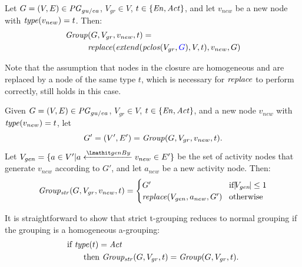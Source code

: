 \vspace{10pt}
\begin{definition}[t-Grouping]
\label{def:t-grouping}
Let $G=(V,E) \in \mathit{PG}_{gu/ea}$, $V_{gr} \in V$, $t \in \{\mathit{En}, \mathit{Act}\}$, and let  $v_{new}$ be a new node with $\mathit{type}(v_{new}) = t$.
%
Then:
\begin{align*} 
\group & (G, V_{gr}, v_{new}, t) = \\
& \repl( \extend(\clos(V_{gr},\jwb{G}), V, t), v_{new},  G )
\end{align*}
\label{eq:t-grouping}
\end{definition}

Note that the assumption that  nodes in the closure are homogeneous and are replaced by a node of the same type $t$, which is necessary for $\mathit{replace}$ to perform correctly, still holds in this case. 

\begin{definition}
Given 
$G=(V,E) \in \mathit{PG}_{gu/ea}$, $V_{gr} \in V$, $t \in \{\mathit{En}, \mathit{Act}\}$, and a new node $v_{new}$ with $\mathit{type}(v_{new}) = t$, let
\[ G' = (V',E') = \mathit{Group}(G, V_{gr}, v_{new}, t). \]
Let 
$V_{gen} = \{ a \in V' |  a \xleftarrow{\wgby} v_{new} \in E' \}$ be the set of activity nodes that generate $v_{new}$ according to $G'$, and let $a_{new}$ be a new activity node. Then:
\begin{equation*}
\mathit{Group_{str}}(G, V_{gr},v_{new}, t)=
\begin{cases}
G' & \!\text{if}  |\!V_{gen}\!| \leq 1  \\
\mathit{replace}(V_{gen}, a_{new}, G') & \!\text{otherwise } 
\end{cases}
\end{equation*}
\label{def:strict-t-grouping}
\end{definition}

% 
% 


It is straightforward to show that strict t-grouping reduces to normal grouping if the grouping is a homogeneous a-grouping:
\begin{align*}
&\text{if } \mathit{type}(t) =  \mathit{Act} \\
 &\qquad\text{then } \mathit{Group_{str}}(G, V_{gr},t) = \mathit{Group}(G, V_{gr},t). 
\end{align*}


